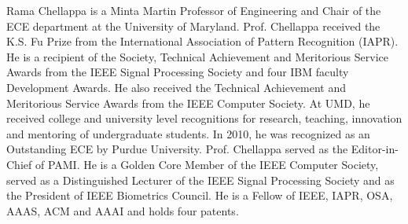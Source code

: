 \documentclass[10pt,journal,compsoc]{IEEEtran}
\begin{document}
\vspace{-20pt}
\begin{IEEEbiography}{Rama Chellappa}
is a Minta Martin Professor of Engineering and Chair of the ECE department at the University of Maryland. Prof. Chellappa received the K.S. Fu Prize from the International Association of Pattern Recognition (IAPR). He is a recipient of the Society, Technical Achievement and Meritorious Service Awards from the IEEE Signal Processing Society and four IBM faculty Development Awards. He also received the Technical Achievement and Meritorious Service Awards from the IEEE Computer Society. At UMD, he received college and university level recognitions for research, teaching, innovation and mentoring of undergraduate students. In 2010, he was recognized as an Outstanding ECE by Purdue University. Prof. Chellappa served as the Editor-in-Chief of PAMI. He is a Golden Core Member of the IEEE Computer Society, served as a Distinguished Lecturer of the IEEE Signal Processing Society and as the President of IEEE Biometrics Council. He is a Fellow of IEEE, IAPR, OSA, AAAS, ACM and AAAI and holds four patents.
\end{IEEEbiography}











\end{document}
